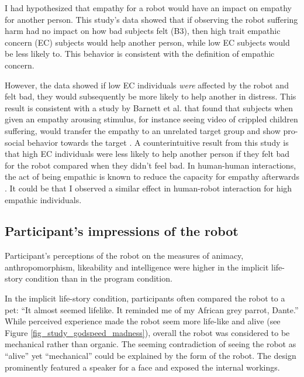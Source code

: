 I had hypothesized that empathy for a robot would have an impact on empathy for another person. This study's data showed that if observing the robot suffering harm had no impact on how bad subjects felt (B3), then high trait empathic concern (EC) subjects would help another person, while low EC subjects would be less likely to. This behavior is consistent with the definition of empathic concern. 

However, the data showed if low EC individuals \emph{were} affected by the robot and felt bad, they would subsequently be more likely to help another in distress. This result is consistent with a study by Barnett et al. that found that subjects when given an empathy arousing stimulus, for instance seeing video of crippled children suffering, would transfer the empathy to an unrelated target group and show pro-social behavior towards the target \cite{barnett_empathy_transfer}. 
A counterintuitive result from this study is that high EC individuals were less likely to help another person if they felt bad for the robot compared when they didn't feel bad.  In human-human interactions, the act of being empathic is known to reduce the capacity for empathy afterwards \cite{figley_compassion_fatigue_therapists}. It could be that I observed a similar effect in human-robot interaction for high empathic individuals. 


\subsection{Participant's impressions of the robot}

Participant's perceptions of the robot on the measures of animacy, anthropomorphism, likeability and intelligence were higher in the implicit life-story condition than in the program condition. 

In the implicit life-story condition, participants often compared the robot to a pet: ``It almost seemed lifelike.  It reminded me of my African grey parrot, Dante.'' While perceived experience made the robot seem more life-like and alive (see Figure \ref{fig_study_godspeed_madness}), overall the robot was considered to be mechanical rather than organic. The seeming contradiction of seeing the robot as ``alive'' yet ``mechanical'' could be explained by the form of the robot. The design prominently featured a speaker for a face and exposed the internal workings.

